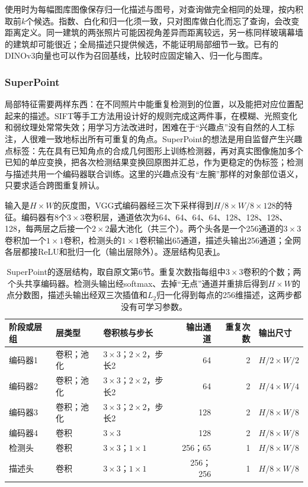 使用时为每幅图库图像保存归一化描述与图号，对查询做完全相同的处理，按内积取前$k$个候选。指数、白化和归一化须一致，只对图库做白化而忘了查询，会改变距离定义。同一建筑的两张照片可能因视角差异而距离较远，另一栋同样玻璃幕墙的建筑却可能很近；全局描述只提供候选，不能证明局部细节一致。已有的DINOv3向量也可以作为召回基线，比较时应固定输入、归一化与图库。

\subsubsection{SuperPoint}
\label{sec:vision-recognition-superpoint}

局部特征需要两样东西：在不同照片中能重复检测到的位置，以及能把对应位置配起来的描述。SIFT等手工方法用设计好的规则完成这两件事，在模糊、光照变化和弱纹理处常常失效；用学习方法改进时，困难在于“兴趣点”没有自然的人工标注，人很难一致地标出所有可重复的角点。SuperPoint的想法是用自监督产生兴趣点标签：先在具有已知角点的合成几何图形上训练检测器，再对真实图像施加多个已知的单应变换，把各次检测结果变换回原图并汇总，作为更稳定的伪标签；检测与描述共用一个编码器联合训练。这里的兴趣点没有“左腕”那样的对象部位语义，只要求适合跨图重复辨认。

输入是$H\times W$的灰度图，VGG式编码器经三次下采样得到$H/8\times W/8\times128$的特征。编码器有8个$3\times3$卷积层，通道依次为64、64、64、64、128、128、128、128，每两层之后接一个$2\times2$最大池化（共三个）。两个头各是一个256通道的$3\times3$卷积加一个$1\times1$卷积，检测头的$1\times1$卷积输出65通道，描述头输出256通道；全网各层都接ReLU和批归一化（输出层除外）。逐层结构见表\ref{tab:vision-recognition-superpoint-layers}。

\begin{table}[tbp]
 \centering
 \small
 \begin{tabular}{@{}lllrrl@{}}
 \toprule
 阶段或层组 & 层类型 & 卷积核与步长 & 输出通道 & 重复次数 & 输出尺寸\\
 \midrule
 编码器1 & 卷积；池化 & $3\times3$；$2\times2$，步长2 & 64 & 2 & $H/2\times W/2$\\
 编码器2 & 卷积；池化 & $3\times3$；$2\times2$，步长2 & 64 & 2 & $H/4\times W/4$\\
 编码器3 & 卷积；池化 & $3\times3$；$2\times2$，步长2 & 128 & 2 & $H/8\times W/8$\\
 编码器4 & 卷积 & $3\times3$ & 128 & 2 & $H/8\times W/8$\\
 检测头 & 卷积 & $3\times3$；$1\times1$ & 256；65 & 1 & $H/8\times W/8$\\
 描述头 & 卷积 & $3\times3$；$1\times1$ & 256；256 & 1 & $H/8\times W/8$\\
 \bottomrule
 \end{tabular}
 \caption{SuperPoint的逐层结构，取自原文第6节。重复次数指每组中$3\times3$卷积的个数；两个头共享编码器。检测头输出经softmax、去掉“无点”通道并重排后得到$H\times W$的点分数图，描述头输出经双三次插值和$L_2$归一化得到每点的256维描述，这两步都没有可学习参数。}
 \label{tab:vision-recognition-superpoint-layers}
\end{table}

